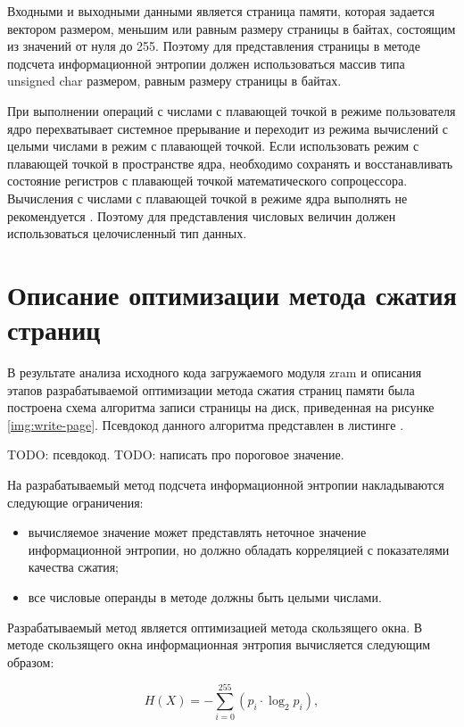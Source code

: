 Входными и выходными данными является страница памяти, которая задается вектором размером, меньшим или равным размеру страницы в байтах, состоящим из значений от нуля до 255. Поэтому для представления страницы в методе подсчета информационной энтропии должен использоваться массив типа unsigned char размером, равным размеру страницы в байтах.

При выполнении операций с числами с плавающей точкой в режиме пользователя ядро перехватывает системное прерывание и переходит из режима вычислений с целыми числами в режим с плавающей точкой. Если использовать режим с плавающей точкой в пространстве ядра, необходимо сохранять и восстанавливать состояние регистров с плавающей точкой математического сопроцессора. Вычисления с числами с плавающей точкой в режиме ядра выполнять не рекомендуется \cite{love}. Поэтому для представления числовых величин должен использоваться целочисленный тип данных. 

\section{Описание оптимизации метода сжатия страниц}

В результате анализа исходного кода загружаемого модуля zram \cite{zram-code} и описания этапов разрабатываемой оптимизации метода сжатия страниц памяти была построена схема алгоритма записи страницы на диск, приведенная на рисунке \ref{img:write-page}. Псевдокод данного алгоритма представлен в листинге .

TODO: псевдокод.
TODO: написать про пороговое значение.

На разрабатываемый метод подсчета информационной энтропии накладываются следующие ограничения:

\begin{itemize}
	\item вычисляемое значение может представлять неточное значение информационной энтропии, но должно обладать корреляцией с показателями качества сжатия;
	\item все числовые операнды в методе должны быть целыми числами.
\end{itemize}

Разрабатываемый метод является оптимизацией метода скользящего окна. В методе скользящего окна информационная энтропия вычисляется следующим образом:

\begin{equation}
	H(X) = -\sum_{i = 0}^{255} (p_{i} \cdot \log_{2}p_{i}),
\end{equation}

